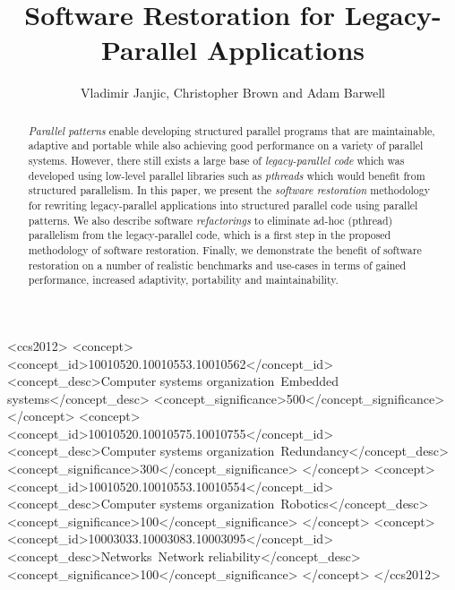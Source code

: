 \documentclass[sigconf,10pt]{acmart}
\begin{document}
\title{Software Restoration for Legacy-Parallel Applications}


\author{Vladimir Janjic, Christopher Brown and Adam Barwell}

\renewcommand{\shortauthors}{V. Janjic et al.}


\begin{abstract}
    \emph{Parallel patterns} enable developing structured parallel programs that are maintainable, adaptive and portable while also achieving good performance on a variety of parallel systems. However, there still exists a large base of \emph{legacy-parallel code} which was developed using low-level parallel libraries such as \emph{pthreads} which would benefit from structured parallelism. In this paper, we present the \emph{software restoration} methodology for rewriting legacy-parallel applications into structured parallel code using parallel patterns. We also describe software \emph{refactorings} to eliminate ad-hoc (pthread) parallelism from the legacy-parallel code, which is a first step in the proposed methodology of software restoration. Finally, we demonstrate the benefit of software restoration on a number of realistic benchmarks and use-cases in terms of gained performance, increased adaptivity, portability and maintainability.
\end{abstract}

%
%
\begin{CCSXML}
<ccs2012>
 <concept>
  <concept_id>10010520.10010553.10010562</concept_id>
  <concept_desc>Computer systems organization~Embedded systems</concept_desc>
  <concept_significance>500</concept_significance>
 </concept>
 <concept>
  <concept_id>10010520.10010575.10010755</concept_id>
  <concept_desc>Computer systems organization~Redundancy</concept_desc>
  <concept_significance>300</concept_significance>
 </concept>
 <concept>
  <concept_id>10010520.10010553.10010554</concept_id>
  <concept_desc>Computer systems organization~Robotics</concept_desc>
  <concept_significance>100</concept_significance>
 </concept>
 <concept>
  <concept_id>10003033.10003083.10003095</concept_id>
  <concept_desc>Networks~Network reliability</concept_desc>
  <concept_significance>100</concept_significance>
 </concept>
</ccs2012>
\end{CCSXML}
\end{document}
